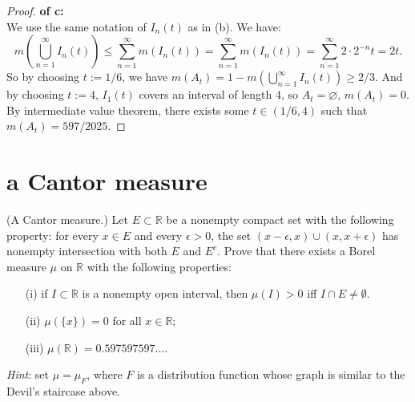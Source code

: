 \documentclass[lang=cn,11pt]{elegantbook}
\begin{document}
\begin{proof}
 \textbf{   of c:\\}
 We use the same notation of $I_n(t)$ as in (b). We have:
 $$
 m(\bigcup_{n=1}^\infty I_n(t) )  \leq  \sum_{n=1}^\infty m(I_n(t)) = \sum_{n=1}^\infty m(I_n(t)) =  \sum_{n=1}^\infty2\cdot 2^{-n} t = 2t.
 $$
 So by choosing $t:= 1/6$, we have $m(A_t) = 1 -  m(\bigcup_{n=1}^\infty I_n(t) ) \geq 2/3$.
 And by choosing $t:= 4$, $I_1(t)$ covers an interval of length $4$, so $A_t = \varnothing$, $m(A_t) = 0$.
 By intermediate value theorem, there exists some $t \in(1/6, 4)$ such that $m(A_t)=597/2025$.
\end{proof}


\section{a Cantor measure}
  (A Cantor measure.)
  Let $E\subset \mathbb{R}$ be a nonempty compact set with the following property: for every $x\in E$ and every $\epsilon>0$, the set $(x-\epsilon,x)\cup(x,x+\epsilon)$ has nonempty intersection with both $E$ and $E^c$. Prove that there exists a Borel measure $\mu$ on $\mathbb{R}$ with the following properties:
  \begin{itemize}
  \item[(i)]
    if $I\subset \mathbb{R}$ is a nonempty open interval, then $\mu(I)>0$ iff $I\cap E\ne\emptyset$.
  \item[(ii)]
    $\mu(\{x\})=0$ for all $x\in\mathbb{R}$; 
  \item[(iii)]
    $\mu(\mathbb{R})=0.597597597\dots$.
  \end{itemize}
  \textit{Hint}: set $\mu=\mu_F$, where $F$ is a distribution function whose graph is similar to the Devil's staircase above.
 
\end{document}
